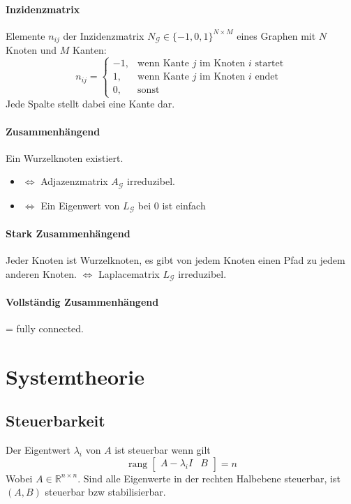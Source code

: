 \paragraph{Inzidenzmatrix}
Elemente $n_{ij}$ der Inzidenzmatrix $N_\mathcal{G} \in \{-1,0,1\}^{N \times M}$ eines Graphen mit $N$ Knoten und $M$ Kanten:
\begin{equation}
    n_{ij} = \begin{cases}
        -1, & \text{wenn Kante $j$ im Knoten $i$ startet} \\
        1,  & \text{wenn Kante $j$ im Knoten $i$ endet} \\
        0,  & \text{sonst}
    \end{cases}
\end{equation}
Jede Spalte stellt dabei eine Kante dar.

\paragraph{Zusammenhängend}
Ein Wurzelknoten existiert.
\begin{itemize}
    \item $\iff$ Adjazenzmatrix $A_\mathcal{G}$ irreduzibel.
    \item $\iff$ Ein Eigenwert von $L_\mathcal{G}$ bei 0 ist einfach
\end{itemize}


\paragraph{Stark Zusammenhängend}
Jeder Knoten ist Wurzelknoten, es gibt von jedem Knoten einen Pfad zu
jedem anderen Knoten.
$\iff$ Laplacematrix $L_\mathcal{G}$ irreduzibel.


\paragraph{Vollständig Zusammenhängend}
= fully connected.


\section{Systemtheorie}

\subsection{Steuerbarkeit}
\label{sec:steuerbar}
Der Eigentwert $\lambda_i$ von $A$ ist steuerbar wenn gilt
\begin{equation}
    \operatorname{rang}\begin{bmatrix}
        A-\lambda_i I & B
    \end{bmatrix} = n
\end{equation}
Wobei $A \in \mathbb{R}^{n\times n}$.
Sind alle Eigenwerte in der rechten Halbebene steuerbar, ist $(A, B)$
steuerbar bzw stabilisierbar.

